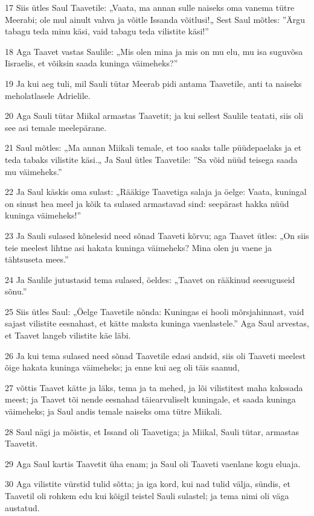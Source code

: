 \par 17 Siis ütles Saul Taavetile: „Vaata, ma annan sulle naiseks oma vanema tütre Meerabi; ole mul ainult vahva ja võitle Issanda võitlusi!„ Sest Saul mõtles: ”Ärgu tabagu teda minu käsi, vaid tabagu teda vilistite käsi!”
\par 18 Aga Taavet vastas Saulile: „Mis olen mina ja mis on mu elu, mu isa suguvõsa Iisraelis, et võiksin saada kuninga väimeheks?”
\par 19 Ja kui aeg tuli, mil Sauli tütar Meerab pidi antama Taavetile, anti ta naiseks meholatlasele Adrielile.
\par 20 Aga Sauli tütar Miikal armastas Taavetit; ja kui sellest Saulile teatati, siis oli see asi temale meelepärane.
\par 21 Saul mõtles: „Ma annan Miikali temale, et too saaks talle püüdepaelaks ja et teda tabaks vilistite käsi.„ Ja Saul ütles Taavetile: ”Sa võid nüüd teisega saada mu väimeheks.”
\par 22 Ja Saul käskis oma sulast: „Rääkige Taavetiga salaja ja öelge: Vaata, kuningal on sinust hea meel ja kõik ta sulased armastavad sind: seepärast hakka nüüd kuninga väimeheks!”
\par 23 Ja Sauli sulased kõnelesid need sõnad Taaveti kõrvu; aga Taavet ütles: „On siis teie meelest lihtne asi hakata kuninga väimeheks? Mina olen ju vaene ja tähtsuseta mees.”
\par 24 Ja Saulile jutustasid tema sulased, öeldes: „Taavet on rääkinud seesuguseid sõnu.”
\par 25 Siis ütles Saul: „Öelge Taavetile nõnda: Kuningas ei hooli mõrsjahinnast, vaid sajast vilistite eesnahast, et kätte maksta kuninga vaenlastele.” Aga Saul arvestas, et Taavet langeb vilistite käe läbi.
\par 26 Ja kui tema sulased need sõnad Taavetile edasi andsid, siis oli Taaveti meelest õige hakata kuninga väimeheks; ja enne kui aeg oli täis saanud,
\par 27 võttis Taavet kätte ja läks, tema ja ta mehed, ja lõi vilistitest maha kakssada meest; ja Taavet tõi nende eesnahad täiearvuliselt kuningale, et saada kuninga väimeheks; ja Saul andis temale naiseks oma tütre Miikali.
\par 28 Saul nägi ja mõistis, et Issand oli Taavetiga; ja Miikal, Sauli tütar, armastas Taavetit.
\par 29 Aga Saul kartis Taavetit üha enam; ja Saul oli Taaveti vaenlane kogu eluaja.
\par 30 Aga vilistite vürstid tulid sõtta; ja iga kord, kui nad tulid välja, sündis, et Taavetil oli rohkem edu kui kõigil teistel Sauli sulastel; ja tema nimi oli väga austatud.

